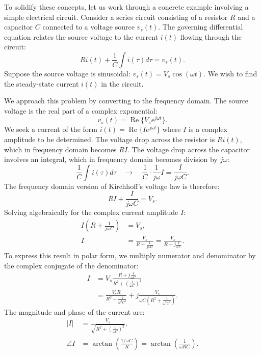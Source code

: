 To solidify these concepts, let us work through a concrete example involving a simple electrical circuit. Consider a series circuit consisting of a resistor $R$ and a capacitor $C$ connected to a voltage source $v_s(t)$. The governing differential equation relates the source voltage to the current $i(t)$ flowing through the circuit:
\begin{equation}
Ri(t) + \frac{1}{C}\int i(\tau)d\tau = v_s(t).
\end{equation}
Suppose the source voltage is sinusoidal: $v_s(t) = V_s\cos(\omega t)$. We wish to find the steady-state current $i(t)$ in the circuit.

We approach this problem by converting to the frequency domain. The source voltage is the real part of a complex exponential:
\begin{equation}
v_s(t) = \operatorname{Re}\{V_s e^{j\omega t}\}.
\end{equation}
We seek a current of the form $i(t) = \operatorname{Re}\{I e^{j\omega t}\}$ where $I$ is a complex amplitude to be determined. The voltage drop across the resistor is $Ri(t)$, which in frequency domain becomes $RI$. The voltage drop across the capacitor involves an integral, which in frequency domain becomes division by $j\omega$:
\begin{equation}
\frac{1}{C}\int i(\tau)d\tau \quad\longrightarrow\quad \frac{1}{C}\cdot\frac{1}{j\omega}I = \frac{I}{j\omega C}.
\end{equation}
The frequency domain version of Kirchhoff's voltage law is therefore:
\begin{equation}
RI + \frac{I}{j\omega C} = V_s.
\end{equation}
Solving algebraically for the complex current amplitude $I$:
\begin{align}
I\left(R + \frac{1}{j\omega C}\right) &= V_s, \\
I &= \frac{V_s}{R + \frac{1}{j\omega C}} = \frac{V_s}{R - j\frac{1}{\omega C}}.
\end{align}
To express this result in polar form, we multiply numerator and denominator by the complex conjugate of the denominator:
\begin{align}
I &= V_s\frac{R + j\frac{1}{\omega C}}{R^2 + \left(\frac{1}{\omega C}\right)^2} \\
&= \frac{V_s R}{R^2 + \frac{1}{\omega^2 C^2}} + j\frac{V_s}{\omega C\left(R^2 + \frac{1}{\omega^2 C^2}\right)}.
\end{align}
The magnitude and phase of the current are:
\begin{align}
|I| &= \frac{V_s}{\sqrt{R^2 + \left(\frac{1}{\omega C}\right)^2}}, \\
\angle I &= \arctan\left(\frac{1/\omega C}{R}\right) = \arctan\left(\frac{1}{\omega RC}\right).
\end{align}
